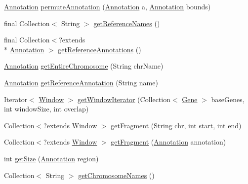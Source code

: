 \begin{DoxyCompactItemize}
\item 
\hyperlink{interfaceumms_1_1core_1_1annotation_1_1_annotation}{Annotation} \hyperlink{classumms_1_1core_1_1coordinatesystem_1_1_transcript_in_genomic_space_a098c63ad5f3e392ed32cd9d62a41dc7e}{permute\+Annotation} (\hyperlink{interfaceumms_1_1core_1_1annotation_1_1_annotation}{Annotation} a, \hyperlink{interfaceumms_1_1core_1_1annotation_1_1_annotation}{Annotation} bounds)
\item 
final Collection$<$ String $>$ \hyperlink{classumms_1_1core_1_1coordinatesystem_1_1_transcript_in_genomic_space_a42cdf9b1c85d87e9868cc8edfcdb2687}{get\+Reference\+Names} ()
\item 
final Collection$<$?extends \\*
\hyperlink{interfaceumms_1_1core_1_1annotation_1_1_annotation}{Annotation} $>$ \hyperlink{classumms_1_1core_1_1coordinatesystem_1_1_transcript_in_genomic_space_ae511e3d677e4ae595d484e2e822b8322}{get\+Reference\+Annotations} ()
\item 
\hyperlink{interfaceumms_1_1core_1_1annotation_1_1_annotation}{Annotation} \hyperlink{classumms_1_1core_1_1coordinatesystem_1_1_transcript_in_genomic_space_a254306a08e9c478002e3c721a4c9c540}{get\+Entire\+Chromosome} (String chr\+Name)
\item 
\hyperlink{interfaceumms_1_1core_1_1annotation_1_1_annotation}{Annotation} \hyperlink{classumms_1_1core_1_1coordinatesystem_1_1_transcript_in_genomic_space_aa29f8f9716891ceec997edb80632a8a6}{get\+Reference\+Annotation} (String name)
\item 
Iterator$<$ \hyperlink{interfaceumms_1_1core_1_1feature_1_1_window}{Window} $>$ \hyperlink{classumms_1_1core_1_1coordinatesystem_1_1_transcript_in_genomic_space_acc49469e81707eec90d11149a861240a}{get\+Window\+Iterator} (Collection$<$ \hyperlink{classumms_1_1core_1_1annotation_1_1_gene}{Gene} $>$ base\+Genes, int window\+Size, int overlap)
\item 
Collection$<$?extends \hyperlink{interfaceumms_1_1core_1_1feature_1_1_window}{Window} $>$ \hyperlink{classumms_1_1core_1_1coordinatesystem_1_1_transcript_in_genomic_space_a2a9774c8e5e1a638366899cf97fd2cde}{get\+Fragment} (String chr, int start, int end)
\item 
Collection$<$?extends \hyperlink{interfaceumms_1_1core_1_1feature_1_1_window}{Window} $>$ \hyperlink{classumms_1_1core_1_1coordinatesystem_1_1_transcript_in_genomic_space_a29c88c013931267175dd6cba1a590fb4}{get\+Fragment} (\hyperlink{interfaceumms_1_1core_1_1annotation_1_1_annotation}{Annotation} annotation)
\item 
int \hyperlink{classumms_1_1core_1_1coordinatesystem_1_1_transcript_in_genomic_space_a1c62e35a3558e8f8bb40674d084b6143}{get\+Size} (\hyperlink{interfaceumms_1_1core_1_1annotation_1_1_annotation}{Annotation} region)
\item 
Collection$<$ String $>$ \hyperlink{classumms_1_1core_1_1coordinatesystem_1_1_transcript_in_genomic_space_a0bfff97f8c289cb3d0c264a7d28a7da3}{get\+Chromosome\+Names} ()
\end{DoxyCompactItemize}
